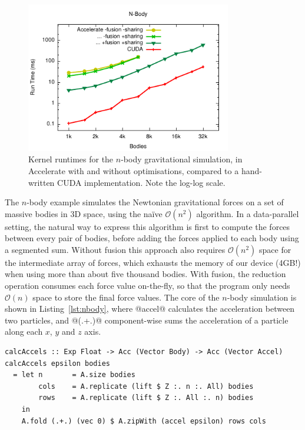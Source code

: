 \begin{figure}
    \begin{center}
        \includegraphics[width=0.8\textwidth]{images/sec-6/nbody/nbody}
    \end{center}
    \caption[N-body gravitational simulation kernel benchmarks]{Kernel runtimes
        for the $n$-body gravitational simulation, in Accelerate with and
        without optimisations, compared to a hand-written CUDA implementation.
        Note the log-log scale.}
    \label{fig:nbody}
\end{figure}

The $n$-body example simulates the Newtonian gravitational forces on a set of
massive bodies in 3D space, using the na\"ive $\mathcal{O}\left( n^{2} \right)$
algorithm. In a data-parallel setting, the natural way to express this algorithm
is first to compute the forces between every pair of bodies, before adding the
forces applied to each body using a segmented sum. Without fusion this approach
also requires $\mathcal{O}\left( n^{2} \right)$ space for the intermediate array
of forces, which exhausts the memory of our device (4GB!) when using more than
about five thousand bodies. With fusion, the reduction operation consumes each
force value on-the-fly, so that the program only needs $\mathcal{O}\left( n
\right)$ space to store the final force values. The core of the $n$-body
simulation is shown in Listing~\ref{lst:nbody}, where @accel@ calculates
the acceleration between two particles, and @(.+.)@ component-wise sums the
acceleration of a particle along each $x$, $y$ and $z$ axis.

\begin{lstlisting}[style=haskell_float
    ,label=lst:nbody
    ,caption={$N$-body gravitational simulation, using parallel reduction}]
calcAccels :: Exp Float -> Acc (Vector Body) -> Acc (Vector Accel)
calcAccels epsilon bodies
  = let n       = A.size bodies
        cols    = A.replicate (lift $ Z :. n :. All) bodies
        rows    = A.replicate (lift $ Z :. All :. n) bodies
    in
    A.fold (.+.) (vec 0) $ A.zipWith (accel epsilon) rows cols
\end{lstlisting}


